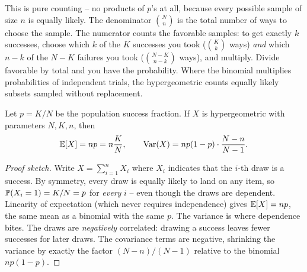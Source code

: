 \begin{whybox}
This is pure counting -- no products of $p$'s at all, because every possible
sample of size $n$ is equally likely. The denominator $\binom{N}{n}$ is the total
number of ways to choose the sample. The numerator counts the favorable samples:
to get exactly $k$ successes, choose which $k$ of the $K$ successes you took
($\binom{K}{k}$ ways) \emph{and} which $n-k$ of the $N-K$ failures you took
($\binom{N-K}{n-k}$ ways), and multiply. Divide favorable by total and you have
the probability. Where the binomial multiplies probabilities of independent
trials, the hypergeometric counts equally likely subsets sampled without replacement.
\end{whybox}

\begin{proposition}
\label{ch07:hypergeom-mv}
Let $p = K/N$ be the population success fraction. If $X$ is hypergeometric with
parameters $N, K, n$, then
\[
  \E[X] = n p = n\frac{K}{N}, \qquad
  \Var(X) = n p (1-p) \cdot \frac{N-n}{N-1}.
\]
\end{proposition}

\begin{proof}[Proof sketch]
Write $X = \sum_{i=1}^{n} X_i$ where $X_i$ indicates that the $i$-th draw is a
success. By symmetry, every draw is equally likely to land on any item, so
$\P(X_i = 1) = K/N = p$ for \emph{every} $i$ -- even though the draws are
dependent. Linearity of expectation (which never requires independence) gives
$\E[X] = np$, the same mean as a binomial with the same $p$. The variance is
where dependence bites. The draws are \emph{negatively} correlated: drawing a
success leaves fewer successes for later draws. The covariance terms are negative,
shrinking the variance by exactly the factor $(N-n)/(N-1)$ relative to the
binomial $np(1-p)$.
\end{proof}


